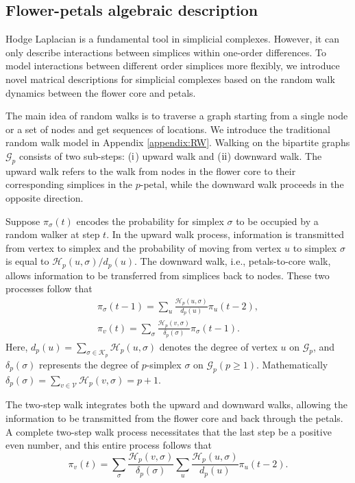 \documentclass[letterpaper]{article} \usepackage{aaai24}
\theoremstyle{plain}
\theoremstyle{definition}
\theoremstyle{remark}
\begin{document}
\subsection{Flower-petals algebraic description} 

Hodge Laplacian \cite{hodge_schaub2020random, Hodge_Hatcher} is a fundamental tool in simplicial complexes.
However, it can only describe interactions between simplices within one-order differences. 
To model interactions between different order simplices more flexibly, we introduce novel matrical descriptions for simplicial complexes based on the random walk dynamics between the flower core and petals.

The main idea of random walks is to traverse a graph starting from a single node or a set of nodes and get sequences of locations. 
We introduce the traditional random walk model in Appendix \ref{appendix:RW}.
Walking on the bipartite graphs $\mathcal{G}_p$ consists of two sub-steps: ($\mathrm{\uppercase\expandafter{\romannumeral 1}}$) upward walk and ($\mathrm{\uppercase\expandafter{\romannumeral 2}}$) downward walk.
The upward walk refers to the walk from nodes in the flower core to their corresponding simplices in the $p$-petal, while the downward walk proceeds in the opposite direction.


Suppose $\pi_\sigma(t)$ encodes the probability for simplex $\sigma$ to be occupied by a random walker at step $t$.
In the upward walk process, information is transmitted from vertex to simplex and the probability of moving from vertex $u$ to simplex $\sigma$ is equal to $\mathcal{H}_p(u,\sigma)/d_p(u)$. 
The downward walk, i.e., petals-to-core walk, allows information to be transferred from simplices back to nodes. These two processes follow that
\begin{align}
    \pi_\sigma(t-1) = \sum_{u} \frac{\mathcal{H}_p(u,\sigma)} {d_p(u)} \pi_u(t-2), \\
    \pi_v(t) = \sum_{\sigma} \frac{\mathcal{H}_p(v, \sigma)}{\delta_p(\sigma)} \pi_\sigma(t-1).
\end{align}
Here,   $d_p(u) = \sum_{\sigma \in \mathcal{K}_p } \mathcal{H}_p(u,\sigma)$ denotes the degree of vertex $u$ on $\mathcal{G}_p$, and $\delta_p(\sigma)$ represents the degree of $p$-simplex $\sigma$ on  $\mathcal{G}_p (p \geq 1)$. Mathematically $\delta_p(\sigma) = \sum_{v \in \mathcal{V} }\mathcal{H}_p(v,\sigma) = p+1$.



The two-step walk  integrates both the upward and downward walks, allowing the information to be transmitted from the flower core and back through the petals. 
A complete two-step walk process necessitates that the last step be a positive even number, and this entire  process follows that
\begin{equation}
    \pi_v(t) = \sum_{\sigma} \frac{\mathcal{H}_p(v,\sigma)}{\delta_p(\sigma)} \sum_{u} \frac{\mathcal{H}_p(u,\sigma)}{d_p(u)} \pi_u(t-2).
\label{equ:wander}
\end{equation}
\end{document}
